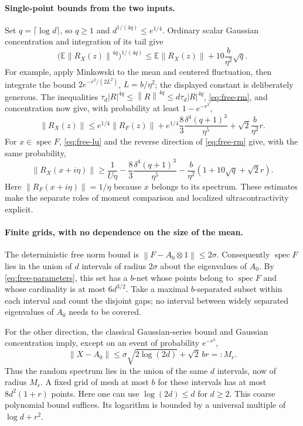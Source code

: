 \documentclass[11pt,a4paper]{article}
\newcommand{\norm}[1]{\left\lVert#1\right\rVert}
\begin{document}
\paragraph{Single-point bounds from the two inputs.}
Set \(q=\lceil\log d\rceil\), so \(q\geq1\) and
\(d^{1/(4q)}\leq e^{1/4}\).
Ordinary scalar Gaussian concentration and integration of its tail give
\[
 \bigl(\mathbb E\norm{R_X(z)}^{4q}\bigr)^{1/(4q)}
 \leq\mathbb E\norm{R_X(z)}+10\frac b{\eta^2}\sqrt q.
\]
For example, apply Minkowski to the mean and centered fluctuation, then
integrate the bound \(2e^{-r^2/(2L^2)}\), \(L=b/\eta^2\); the displayed
constant is deliberately generous.  The inequalities
\(\tau_d|R|^{4q}\leq\norm R^{4q}\leq d\tau_d|R|^{4q}\),
\eqref{eq:free-rm}, and concentration now give, with probability at least
\(1-e^{-r^2}\),
\begin{equation}
 \norm{R_X(z)}
 \leq e^{1/4}\norm{R_F(z)}
  +e^{1/4}\frac83\frac{\delta^4(q+1)^3}{\eta^5}
  +\sqrt2\frac b{\eta^2}r.
 \label{eq:free-point-upper}
\end{equation}
For \(x\in\operatorname{spec}F\), \eqref{eq:free-lu} and the reverse
direction of \eqref{eq:free-rm} give, with the same probability,
\begin{equation}
 \norm{R_X(x+i\eta)}
 \geq\frac1{U\eta}
  -\frac83\frac{\delta^4(q+1)^3}{\eta^5}
  -\frac b{\eta^2}(1+10\sqrt q+\sqrt2r).
 \label{eq:free-point-lower}
\end{equation}
Here \(\norm{R_F(x+i\eta)}=1/\eta\) because \(x\) belongs to its spectrum.
These estimates make the separate roles of moment comparison and
localized ultracontractivity explicit.

\paragraph{Finite grids, with no dependence on the size of the mean.}
The deterministic free norm bound is
\(\norm{F-A_0\otimes1}\leq2\sigma\).
Consequently \(\operatorname{spec}F\) lies in the union of \(d\) intervals
of radius \(2\sigma\) about the eigenvalues of \(A_0\).  By
\eqref{eq:free-parameters}, this set has a \(b\)-net whose points belong to
\(\operatorname{spec}F\) and whose cardinality is at most \(6d^{3/2}\).
Take a maximal \(b\)-separated subset within each interval and count the
disjoint gaps; no interval between widely separated eigenvalues of \(A_0\)
needs to be covered.

For the other direction, the classical Gaussian-series bound and Gaussian
concentration imply, except on an event of probability \(e^{-r^2}\),
\[
 \norm{X-A_0}\leq
 \sigma\sqrt{2\log(2d)}+\sqrt2\,b r=:M_r.
\]
Thus the random spectrum lies in the union of the same \(d\) intervals,
now of radius \(M_r\).  A fixed grid of mesh at most \(b\) for these intervals
has at most \(8d^2(1+r)\) points.  Here one can use
\(\log(2d)\leq d\) for \(d\geq2\).
This coarse polynomial bound suffices.  Its logarithm is bounded by a
universal multiple of \(\log d+r^2\).
\end{document}
